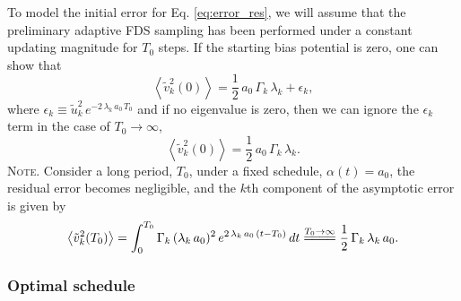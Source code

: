 \documentclass[reprint, superscriptaddress, floatfix]{revtex4-1}
\newcommand{\note}[1]{{\color{DarkGreen}\footnotesize \textsc{Note.} #1}}
\begin{document}
To model the initial error for Eq. \eqref{eq:error_res},
we will assume that
the preliminary adaptive FDS sampling has been
performed under a constant updating magnitude for $T_0$ steps.
%
If the starting bias potential is zero,
one can show that
\begin{equation}
  \left\langle
    {\tilde v}_k^2(0)
  \right\rangle
  = \frac 1 2 \, a_0 \, \Gamma_k \, \lambda_k
  + \epsilon_k
  ,
  \label{eq:xt2_eql1}
\end{equation}
%
where
$\epsilon_k \equiv \tilde u_k^2 \, e^{-2\, \lambda_k \, a_0 \, T_0}$
and if no eigenvalue is zero,
then we can ignore the $\epsilon_k$ term
in the case of $T_0 \to \infty$,
%
\begin{equation}
  \left\langle
    {\tilde v}_k^2(0)
  \right\rangle
  = \frac 1 2 \, a_0 \, \Gamma_k \, \lambda_k
  .
  \label{eq:xt2_eql}
\end{equation}
%
\note{
Consider a long period, $T_0$, under a fixed schedule,
$\alpha(t) = a_0$,
the residual error becomes negligible, and
the $k$th component of the asymptotic error
is given by
%
\begin{align*}
  \left\langle
    {\tilde v}_k^2(T_0)
  \right\rangle
  =
  \int_0^{T_0}
    \Gamma_k \, (\lambda_k \, a_0)^2 \,
      e^{ 2 \, \lambda_k \, a_0 \, (t - T_0) }
    \, dt
  \stackrel{ T_0 \to \infty }
  { =\joinrel=\joinrel=\joinrel= }
  \frac 1 2 \, \Gamma_k \, \lambda_k \, a_0
  .
\notag
\end{align*}
}
%



\subsubsection{\label{sec:optschedule}
Optimal schedule}
\end{document}
